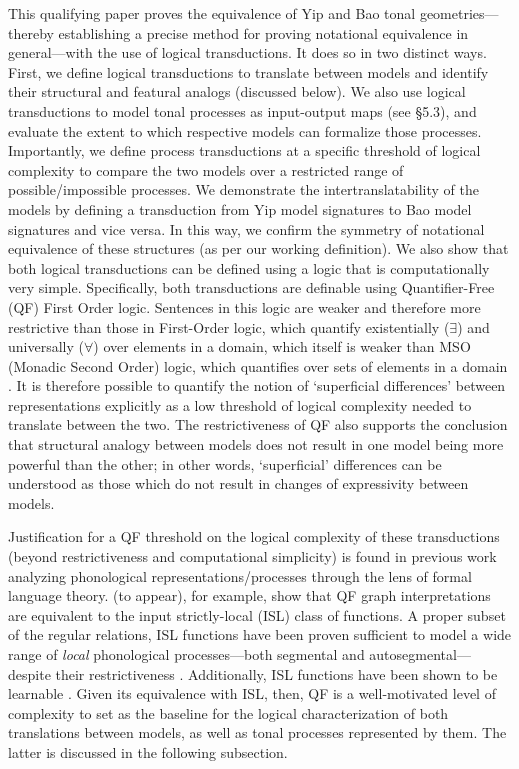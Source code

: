 \documentclass{article}
\begin{document}
This qualifying paper proves the equivalence of Yip and Bao tonal geometries---thereby establishing a precise method for proving notational equivalence in general---with the use of logical transductions. It does so in two distinct ways. First, we define logical transductions to translate between models and identify their structural and featural analogs (discussed below). We also use logical transductions to model tonal processes as input-output maps (see \S5.3), and evaluate the extent to which respective models can formalize those processes. Importantly, we define process transductions at a specific threshold of logical complexity to compare the two models over a restricted range of possible/impossible processes.
We demonstrate the intertranslatability of the models by defining a transduction from Yip model signatures to Bao model signatures and vice versa. In this way, we confirm the symmetry of notational equivalence of these structures (as per our working definition). We also show that both logical transductions can be defined using a logic that is computationally very simple. Specifically, both transductions are definable using Quantifier-Free (QF) First Order logic. Sentences in this logic are weaker and therefore more restrictive than those in First-Order logic, which quantify existentially ($\exists$) and universally ($\forall$) over elements in a domain, which itself is weaker than MSO (Monadic Second Order) logic, which quantifies over sets of elements in a domain \citep{Enderton2001, Fagin1995, Shoenfield2010}. It is therefore possible to quantify the notion of `superficial differences' between representations explicitly as a low threshold of logical complexity needed to translate between the two. The restrictiveness of QF also supports the conclusion that structural analogy between models does not result in one model being more powerful than the other; in other words, `superficial' differences can be understood as those which do not result in changes of expressivity between models. \par
Justification for a QF threshold on the logical complexity of these transductions (beyond restrictiveness and computational simplicity) is found in previous work analyzing phonological representations/processes through the lens of formal language theory. \citeauthor{ChandLindta} (to appear), for example, show that QF graph interpretations are equivalent to the input strictly-local (ISL) class of functions. A proper subset of the regular relations, ISL functions have been proven sufficient to model a wide range of \emph{local} phonological processes---both segmental and autosegmental---despite their restrictiveness \citep{Chandlee2014, ChandJard}. Additionally, ISL functions have been shown to be learnable \citep{Chandleeetal2014}. Given its equivalence with ISL, then, QF is a well-motivated level of complexity to set as the baseline for the logical characterization of both translations between models, as well as tonal processes represented by them. The latter is discussed in the following subsection.
\end{document}
